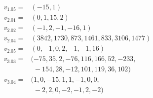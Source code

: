 \begin{align*}
v_{\text{1.05}}={}&(-15,1) \\
v_{\text{2.01}}={}&(0,1,15,2) \\
v_{\text{2.02}}={}&(-1,2,-1,-16,1) \\
v_{\text{2.04}}={}&(3842,1730,873,1461,833,3106,1477) \\
v_{\text{2.05}}={}&(0,-1,0,2,-1,-1,16) \\
v_{\text{3.03}}={}&(-75,35,2,-76,116,166,52,-233,\\
 &\phantom{(}-154,28,-12,101,119,36,102) \\
v_{\text{3.04}}={}&(1,0,-15,1,1,-1,0,0,\\
 &\phantom{(}-2,2,0,-2,-1,2,-2) \\
\end{align*}
